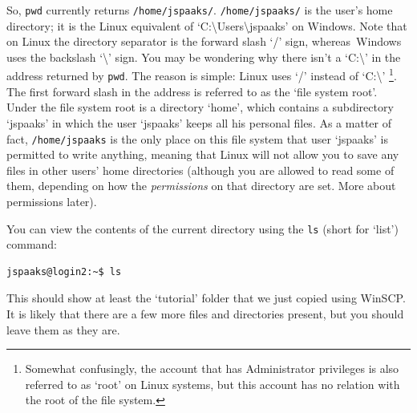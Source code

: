 So, \texttt{pwd} currently returns \texttt{/home/jspaaks/}. \texttt{/home/jspaaks/} is the user's home directory; it is the Linux equivalent of `C:\textbackslash{}Users\textbackslash{}jspaaks' on Windows. Note that on Linux the directory separator  is the forward slash `/' sign, whereas~Windows uses the backslash `\textbackslash{}' sign. You may be wondering why there isn't a `C:\textbackslash{}' in the address returned by \texttt{pwd}. The reason is simple: Linux uses `/' instead of `C:\textbackslash{}' \footnote{Somewhat confusingly, the account that has Administrator privileges is also referred to as `root' on Linux systems, but this account has no relation with the root of the file system.}. The first forward slash in the address is referred to as the `file system root'. Under the file system root is a directory `home', which contains a subdirectory `jspaaks' in which the user `jspaaks' keeps all his personal files. As a matter of fact, \texttt{/home/jspaaks} is the only place on this file system that user `jspaaks' is permitted to write anything, meaning that Linux will not allow you to save any files in other users' home directories (although you are allowed to read some of them, depending on how the \textit{permissions} on that directory are set. More about permissions later).

You can view the contents of the current directory using the \texttt{ls} (short for `list') command:
\begin{lstlisting}[style=basic,style=bash]
jspaaks@login2:~$ ls
\end{lstlisting}
This should show at least the `tutorial' folder that we just copied using WinSCP. It is likely that there are a few more files and directories present, but you should leave them as they are.

